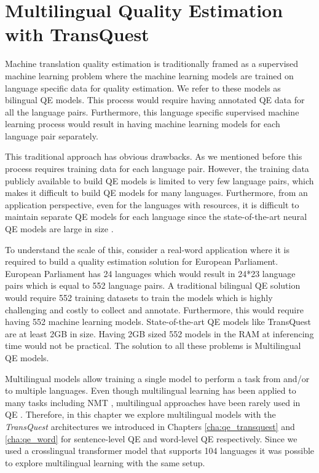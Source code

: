 \newcommand\figlength{6cm}

\chapter{\label{cha:qe_multilingual}Multilingual Quality Estimation with TransQuest}

Machine translation quality estimation is traditionally framed as a supervised machine learning problem \cite{kepler-etal-2019-openkiwi,lee-2020-two} where the machine learning models are trained on language specific data for quality estimation. We refer to these models as bilingual QE models. This process would require having annotated QE data for all the language pairs. Furthermore, this language specific supervised machine learning process would result in having machine learning models for each language pair separately. 

This traditional approach has obvious drawbacks. As we mentioned before this process requires training data for each language pair. However, the training data publicly available to build QE models is limited to very few language pairs, which makes it difficult to build QE models for many languages. Furthermore, from an application perspective, even for the languages with resources, it is difficult to maintain separate QE models for each language since the state-of-the-art neural QE models are large in size \cite{ranasinghe-etal-2020-transquest}. 

To understand the scale of this, consider a real-word application where it is required to build a quality estimation solution for European Parliament. European Parliament has 24 languages which would result in 24*23 language pairs which is equal to 552 language pairs. A traditional bilingual QE solution would require 552 training datasets to train the models which is highly challenging and costly to collect and annotate. Furthermore, this would require having 552 machine learning models. State-of-the-art QE models like TransQuest are at least 2GB in size. Having 2GB sized 552 models in the RAM at inferencing time would not be practical. The solution to all these problems is Multilingual QE models. 

Multilingual models allow training a single model to perform a task from and/or to multiple languages. Even though multilingual learning has been applied to many tasks \cite{ranasinghe-zampieri-2020-multilingual,ranasinghe-zampieri-2021-mudes} including NMT \cite{nguyen-chiang-2017-transfer, aharoni-etal-2019-massively}, multilingual approaches have been rarely used in QE \cite{sun-etal-2020-exploratory}. Therefore, in this chapter we explore multilingual models with the \textit{TransQuest} architectures we introduced in Chapters \ref{cha:qe_transquest} and \ref{cha:qe_word} for sentence-level QE and word-level QE respectively. Since we used a crosslingual transformer model that supports 104 languages \cite{conneau-etal-2020-unsupervised} it was possible to explore multilingual learning with the same setup.


